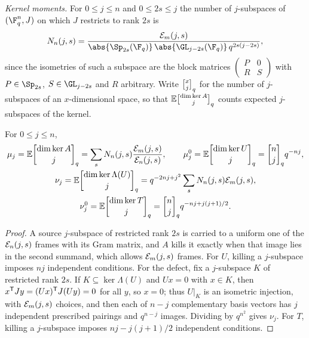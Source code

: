 \emph{Kernel moments.} For $0\le j\le n$ and $0\le2s\le j$ the number of $j$-subspaces of
$(\F_q^n,J)$ on which $J$ restricts to rank $2s$ is
\begin{equation}\label{spn:eq:type-count}
 N_n(j,s)=\frac{\spnEmb_m(j,s)}{\abs{\Sp_{2s}(\F_q)}\,\abs{\GL_{j-2s}(\F_q)}\,q^{2s(j-2s)}},
\end{equation}
since the isometries of such a subspace are the block matrices
$\left(\begin{smallmatrix}P&0\\R&S\end{smallmatrix}\right)$ with $P\in\Sp_{2s}$, $S\in\GL_{j-2s}$
and $R$ arbitrary. Write $\spnqbin{x}{j}{q}$ for the number of $j$-subspaces of an
$x$-dimensional space, so that $\spnE\spnqbin{\dim\ker A}{j}{q}$ counts expected
$j$-subspaces of the kernel.

\begin{lemma}\label{spn:lem:block-moments}
For $0\le j\le n$,
\begin{gather*}
 \mu_j=\spnE\spnqbin{\dim\ker A}{j}{q}=\sum_sN_n(j,s)\frac{\spnEmb_m(j,s)}{\spnEmb_n(j,s)},\qquad
 \mu_j^0=\spnE\spnqbin{\dim\ker U}{j}{q}=\spnqbin{n}{j}{q}q^{-nj},\\
 \nu_j=\spnE\spnqbin{\dim\ker\Lambda(U)}{j}{q}=q^{-2nj+j^2}\sum_sN_n(j,s)\spnEmb_m(j,s),\\
 \nu_j^0=\spnE\spnqbin{\dim\ker T}{j}{q}=\spnqbin{n}{j}{q}q^{-nj+j(j+1)/2}.
\end{gather*}
\end{lemma}

\begin{proof}
A source $j$-subspace of restricted rank $2s$ is carried to a uniform one of the
$\mathcal{E}_n(j,s)$ frames with its Gram matrix, and $A$ kills it exactly when that image lies in
the second summand, which allows $\mathcal{E}_m(j,s)$ frames. For $U$, killing a $j$-subspace imposes
$nj$ independent conditions. For the defect, fix a $j$-subspace $K$ of restricted rank $2s$. If
$K\subseteq\ker\Lambda(U)$ and $Ux=0$ with $x\in K$, then $x^{\mathsf{T}}Jy=(Ux)^{\mathsf{T}}J(Uy)=0$ for all
$y$, so $x=0$; thus $U|_K$ is an isometric injection, with $\mathcal{E}_m(j,s)$ choices, and then each
of $n-j$ complementary basis vectors has $j$ independent prescribed pairings and $q^{n-j}$
images. Dividing by $q^{n^2}$ gives $\nu_j$. For $T$, killing a $j$-subspace imposes
$nj-j(j+1)/2$ independent conditions.
\end{proof}

